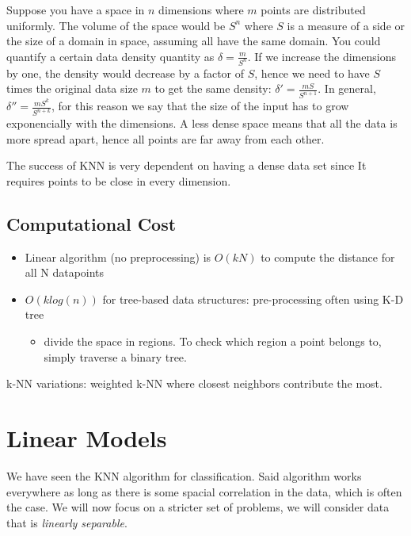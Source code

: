\documentclass{article}
\begin{document}
Suppose you have a space in \(n\) dimensions where \(m\) points are
distributed uniformly. The volume of the space would be \(S^n\) where
\(S\) is a measure of a side or the size of a domain in space, assuming
all have the same domain. You could quantify a certain data density
quantity as \(\delta = \frac{m}{S^n}\). If we increase the dimensions by
one, the density would decrease by a factor of \(S\), hence we need to
have \(S\) times the original data size \(m\) to get the same density:
\(\delta' = \frac{mS}{S^{n+1}}\). In general,
\(\delta''=\frac{mS^k}{S^{n+k}}\), for this reason we say that the size
of the input has to grow exponencially with the dimensions. A less dense
space means that all the data is more spread apart, hence all points are
far away from each other.

The success of KNN is very dependent on having a dense data set since It
requires points to be close in every dimension.

\subsection{Computational Cost}\label{computational-cost}

\begin{itemize}
\tightlist
\item
  Linear algorithm (no preprocessing) is \(O(kN)\) to compute the
  distance for all N datapoints
\item
  \(O(klog(n))\) for tree-based data structures: pre-processing often
  using K-D tree

  \begin{itemize}
  \tightlist
  \item
    divide the space in regions. To check which region a point belongs
    to, simply traverse a binary tree.
  \end{itemize}
\end{itemize}

k-NN variations: weighted k-NN where closest neighbors contribute the
most.

\section{Linear Models}\label{linear-models}

We have seen the KNN algorithm for classification. Said algorithm works
everywhere as long as there is some spacial correlation in the data,
which is often the case. We will now focus on a stricter set of
problems, we will consider data that is \emph{linearly separable}.
\end{document}
